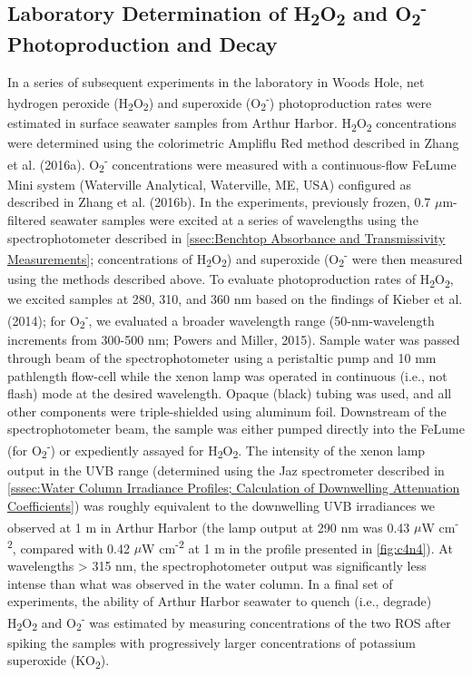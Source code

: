 \subsection{Laboratory Determination of H\textsubscript{2}O\textsubscript{2} and O\textsubscript{2}\textsuperscript{-} Photoproduction and Decay}
\label{ssec:Laboratory Determination of ROS Photoproduction and Decay}

In a series of subsequent experiments in the laboratory in Woods Hole, net hydrogen peroxide (H\textsubscript{2}O\textsubscript{2}) and superoxide (O\textsubscript{2}\textsuperscript{-}) photoproduction rates were estimated in surface seawater samples from Arthur Harbor. H\textsubscript{2}O\textsubscript{2} concentrations were determined using the colorimetric Ampliflu Red method described in Zhang et al. (2016a). O\textsubscript{2}\textsuperscript{-} concentrations were measured with a continuous-flow FeLume Mini system (Waterville Analytical, Waterville, ME, USA) configured as described in Zhang et al. (2016b). In the experiments, previously frozen, 0.7 $\mu$m-filtered seawater samples were excited at a series of wavelengths using the spectrophotometer described in \autoref{ssec:Benchtop Absorbance and Transmissivity Measurements}; concentrations of H\textsubscript{2}O\textsubscript{2}) and superoxide (O\textsubscript{2}\textsuperscript{-} were then measured using the methods described above. To evaluate photoproduction rates of H\textsubscript{2}O\textsubscript{2}, we excited samples at 280, 310, and 360 nm based on the findings of Kieber et al. (2014); for O\textsubscript{2}\textsuperscript{-}, we evaluated a broader wavelength range (50-nm-wavelength increments from 300-500 nm; Powers and Miller, 2015). Sample water was passed through beam of the spectrophotometer using a peristaltic pump and 10 mm pathlength flow-cell while the xenon lamp was operated in continuous (i.e., not flash) mode at the desired wavelength. Opaque (black) tubing was used, and all other components were triple-shielded using aluminum foil. Downstream of the spectrophotometer beam, the sample was either pumped directly into the FeLume (for O\textsubscript{2}\textsuperscript{-}) or expediently assayed for H\textsubscript{2}O\textsubscript{2}. The intensity of the xenon lamp output in the UVB range (determined using the Jaz spectrometer described in \autoref{sssec:Water Column Irradiance Profiles; Calculation of Downwelling Attenuation Coefficients}) was roughly equivalent to the downwelling UVB irradiances we observed at 1 m in Arthur Harbor (the lamp output at 290 nm was 0.43 $\mu$W cm\textsuperscript{-2}, compared with 0.42 $\mu$W cm\textsuperscript{-2} at 1 m in the profile presented in \autoref{fig:c4n4}). At wavelengths \textgreater{} 315 nm, the spectrophotometer output was significantly less intense than what was observed in the water column. In a final set of experiments, the ability of Arthur Harbor seawater to quench (i.e., degrade) H\textsubscript{2}O\textsubscript{2} and O\textsubscript{2}\textsuperscript{-} was estimated by measuring concentrations of the two ROS after spiking the samples with progressively larger concentrations of potassium superoxide (KO\textsubscript{2}).
